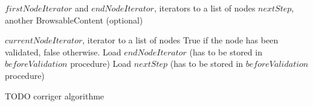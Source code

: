 \begin{algorithm}[H]
\caption{}
\begin{algorithmic}
\REQUIRE $firstNodeIterator$ and $endNodeIterator$, iterators to a list of nodes
\REQUIRE $nextStep$, another BrowsableContent (optional)
\STATE {}
\RETURN \browseDown
\end{algorithmic}
\end{algorithm}

\begin{algorithm}[H]
\caption{}
\begin{algorithmic}
\REQUIRE $currentNodeIterator$, iterator to a list of nodes
\ENSURE True if the node has been validated, false otherwise.
\STATE Load $endNodeIterator$ (has to be stored in $beforeValidation$ procedure)
\STATE Load $nextStep$ (has to be stored in $beforeValidation$ procedure)
\IF{\browseDown}
\STATE {}
\RETURN \TRUE
\ELSIF{\browseUp}
\STATE {}
\RETURN \TRUE
\ELSE
\STATE {}
\RETURN \FALSE
\ENDIF
\end{algorithmic}
\end{algorithm}
\caption{TODO corriger algorithme}
